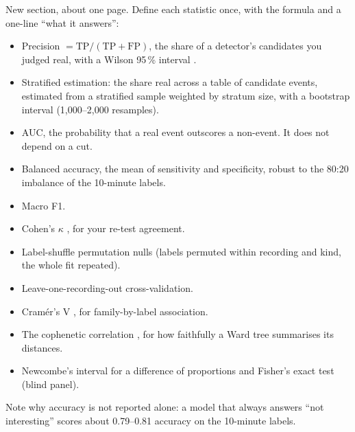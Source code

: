\begin{instructions}
New section, about one page. Define each statistic once, with the formula and a one-line ``what it answers'':
\begin{itemize}
  \item Precision $=\mathrm{TP}/(\mathrm{TP}+\mathrm{FP})$, the share of a detector's candidates you judged real, with a
        Wilson 95\,\% interval \cite{wilson1927}.
  \item Stratified estimation: the share real across a table of candidate events, estimated from a stratified sample
        weighted by stratum size, with a bootstrap interval \cite{efron1979bootstrap} (1,000--2,000 resamples).
  \item AUC, the probability that a real event outscores a non-event. It does not depend on a cut.
  \item Balanced accuracy, the mean of sensitivity and specificity, robust to the 80:20 imbalance of the 10-minute labels.
  \item Macro F1.
  \item Cohen's $\kappa$ \cite{cohen1960kappa}, for your re-test agreement.
  \item Label-shuffle permutation nulls (labels permuted within recording and kind, the whole fit repeated).
  \item Leave-one-recording-out cross-validation.
  \item Cramér's V \cite{cramer1946}, for family-by-label association.
  \item The cophenetic correlation \cite{sokal1962cophenetic}, for how faithfully a Ward tree \cite{ward1963}
        summarises its distances.
  \item Newcombe's interval for a difference of proportions \cite{newcombe1998} and Fisher's exact test (blind panel).
\end{itemize}
Note why accuracy is not reported alone: a model that always answers ``not interesting'' scores about 0.79--0.81
accuracy on the 10-minute labels.
\end{instructions}
